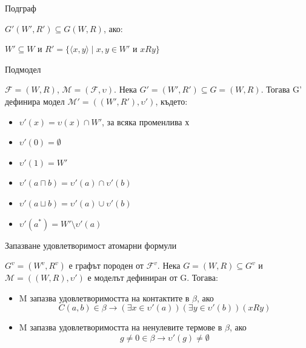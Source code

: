 \documentclass[14pt, aspectratio=169]{beamer}
\newcommand\M{\mathcal{M}}
\newcommand\F{\mathcal{F}}
\newcommand{\pair}[2]{ \langle #1, #2 \rangle }
\newcommand{\pairXY}{ \pair{x}{y} }
\begin{document}
\begin{frame}{Подграф}
	\begin{definition}[Подграф]
		$G'(W', R') \subseteq G(W, R)$, ако:
		\begin{center}
			$W' \subseteq W$ и $R' = \{ \pairXY  \mid x, y \in W'$ и $xRy \}$
		\end{center}
	\end{definition}
\end{frame}

\begin{frame}{Подмодел}
	\begin{lemma}[Подмодел]
		$\F = (W, R)$, $\M = (\F, \upsilon)$. Нека $G'=(W',R') \subseteq G=(W, R)$. Тогава G' дефинира модел $\M' = ((W', R'), \upsilon')$, където:
		\begin{itemize}
			\item $\upsilon'(x) = \upsilon(x) \cap W'$, за всяка променлива х
			\item $\upsilon'(0) = \emptyset$
			\item $\upsilon'(1) = W'$
			\item $\upsilon'(a \sqcap b) = \upsilon'(a) \cap \upsilon'(b)$
			\item $\upsilon'(a \sqcup b) = \upsilon'(a) \cup \upsilon'(b)$
			\item $\upsilon'(a^*) = W' \setminus \upsilon'(a)$
		\end{itemize}
	\end{lemma}
\end{frame}

\begin{frame}{Запазване удовлетворимост атомарни формули}
	\begin{lemma}
		$G^v=(W^v, R^v)$ е графът породен от $\F^v$. Нека $G=(W,R) \subseteq G^v$ и $\M=((W,R), \upsilon')$ е моделът дефиниран от G. Тогава:
		\begin{itemize}
			\item<1-> M запазва удовлетворимостта на контактите в $\beta$, ако
			\begin{equation*}
				C(a,b) \in \beta \rightarrow (\exists x \in \upsilon'(a))(\exists y \in \upsilon'(b))(xRy)
			\end{equation*}

			\item<2-> M запазва удовлетворимостта на ненулевите термове в $\beta$, ако
			\begin{equation*}
				g \neq 0 \in \beta \rightarrow \upsilon'(g) \neq \emptyset
			\end{equation*}
		\end{itemize}
	\end{lemma}
\end{frame}
\end{document}
